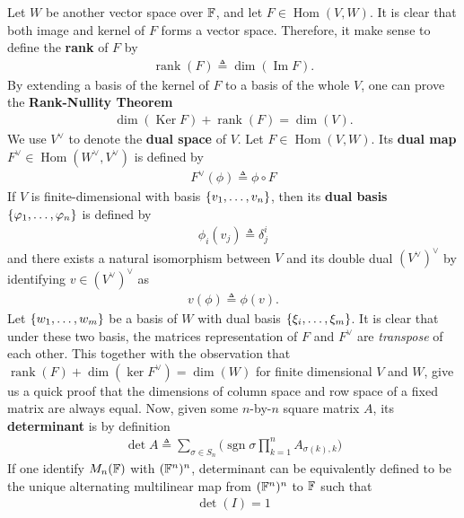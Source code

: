 \documentclass{report}
\begin{document}
Let $W$ be another vector space over  $\mathbb{F}$, and let $F \in \operatorname{Hom}(V,W)$. It is clear that  both image and kernel of $F$ forms a vector space. Therefore, it make sense to define the \textbf{rank} of $F$ by 
 \begin{align*}
\operatorname{rank}(F)\triangleq \operatorname{dim} (\operatorname{Im}F). 
\end{align*}
By extending a basis of the kernel of $F$ to a basis of the whole  $V$, one can prove the  \textbf{Rank-Nullity Theorem} 
\begin{align*}
\operatorname{dim}(\operatorname{Ker}F)+ \operatorname{rank}(F)= \operatorname{dim}(V). 
\end{align*}
We use $V^\vee$ to denote the \textbf{dual space} of $V$. Let $F\in \operatorname{Hom}(V,W)$. Its \textbf{dual map} $F^\vee\in  \operatorname{Hom}(W^{\vee},V^{\vee})$ is defined by 
\begin{align*}
F^\vee (\phi)\triangleq \phi \circ F
\end{align*}
If $V$ is finite-dimensional with basis  $\left\{ v_1,\dots ,v_n \right\}$, then its \textbf{dual basis} $\left\{ \varphi_1,\dots ,\varphi_n \right\}$ is defined by 
\begin{align*}
\phi_i (v_j)\triangleq \delta^i_j
\end{align*}
and there exists a natural isomorphism between $V$ and its double dual  $(V^\vee)^\vee$ by identifying $v\in (V^\vee)^\vee$ as 
\begin{align*}
v(\phi) \triangleq \phi (v). 
\end{align*}
Let $\left\{ w_1,\dots ,w_m \right\}$ be a basis of $W$ with dual basis  $\left\{ \xi_i , \dots ,\xi_m \right\}$. It is clear that under these two basis, the matrices representation of $F$ and  $F^\vee$ are \emph{transpose} of each other. This together with the observation that $\operatorname{rank}(F)+ \operatorname{dim}(\operatorname{ker}F^\vee)= \operatorname{dim}(W)$ for finite dimensional $V$ and  $W$, give us a quick proof that the dimensions of column space and row space of a fixed matrix are always equal. Now, given some $n$-by-$n$ square matrix $A$, its \textbf{determinant} is by definition 
\begin{align*}
\operatorname{det}A\triangleq  \sum_{\sigma \in S_n} \Big(\operatorname{sgn}\sigma \prod_{k=1}^n  A_{\sigma (k),k} \Big)
\end{align*}
If one identify  $M_n(\mathbb{F})$ with  $(\mathbb{F}^n)^n$, determinant can be equivalently defined to be the unique alternating multilinear map from $(\mathbb{F}^n)^n$ to $\mathbb{F}$ such that 
 \begin{align*}
\operatorname{det}(I)=1
\end{align*}
\end{document}
